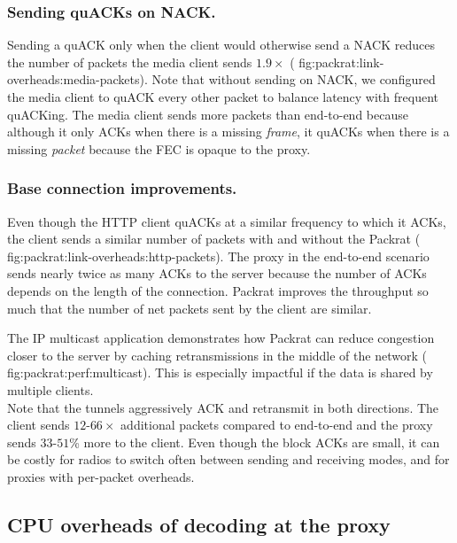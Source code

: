 \subsubsection{Sending quACKs on NACK.}

Sending a quACK only when the client would otherwise send a NACK reduces the
number of packets the media client sends $1.9\!\times$ (\Cref
{fig:packrat:link-overheads:media-packets}). Note that without sending on NACK, we
configured the media client to quACK every other packet to balance latency with
frequent quACKing. The media client sends more packets than end-to-end because
although it only ACKs when there is a missing \textit{frame}, it quACKs when
there is a missing \textit{packet} because the FEC is opaque to the proxy.

\subsubsection{Base connection improvements.}

Even though the HTTP client quACKs at a similar frequency to which it ACKs, the
client sends a similar number of packets with and without the Packrat (\Cref
{fig:packrat:link-overheads:http-packets}). The proxy in the end-to-end scenario sends
nearly twice as many ACKs to the server because the number of ACKs depends on
the length of the connection. Packrat improves the throughput so much that the
number of net packets sent by the client are similar.

The IP multicast application demonstrates how Packrat can reduce congestion closer
to the server by caching retransmissions in the middle of the network (\Cref
{fig:packrat:perf:multicast}). This is especially impactful if the data is shared by
multiple clients.\\

\noindent Note that the tunnels aggressively ACK and retransmit in both
directions. The client sends $12$-$66\!\times$ additional packets compared to
end-to-end and the proxy sends $33$-$51$\% more to the client. Even though the
block ACKs are small, it can be costly for radios to switch often between
sending and receiving modes, and for proxies with per-packet overheads.

\subsection{CPU overheads of decoding at the proxy}
\label{sec:packrat:emulation:cpu-overheads}

